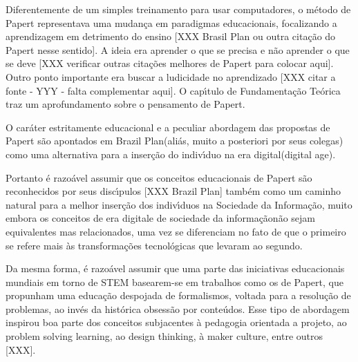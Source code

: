 \documentclass[
12pt,		%
openright,	%
twoside,  %
a4paper,			%
chapter=TITLE,		%
english,			%
french,				%
spanish,			%
brazil				%
]{USPSC-classe/USPSC_RedarTex}
\begin{document}
Diferentemente de um simples treinamento para usar computadores, o m\'etodo de Papert representava uma mudan\c{c}a em paradigmas educacionais, focalizando a aprendizagem em detrimento do ensino [XXX Brasil Plan ou outra cita\c{c}\~ao do Papert nesse sentido]. A ideia era \textquotedbl aprender o que se precisa e n\~ao \textquotedbl aprender o que se deve [XXX verificar outras cita\c{c}\~oes melhores de Papert para colocar aqui]. Outro ponto importante era buscar a ludicidade no aprendizado [XXX citar a fonte - YYY - falta complementar aqui]. O cap\'{\i}tulo de Fundamenta\c{c}\~ao Te\'orica traz um aprofundamento sobre o pensamento de Papert.










O car\'ater estritamente educacional e a peculiar abordagem das propostas de Papert s\~ao apontados em \textquotedbl Brazil Plan\textquotedbl  [XXX] (ali\'as, muito a posteriori por seus colegas) como uma alternativa para a inser\c{c}\~ao do indiv\'{\i}duo na \textquotedbl era digital\textquotedbl  (digital age).










Portanto \'e razo\'avel assumir que os conceitos educacionais de Papert s\~ao reconhecidos por seus disc\'{\i}pulos [XXX Brazil Plan] tamb\'em como um caminho natural para a melhor inser\c{c}\~ao dos indiv\'{\i}duos na Sociedade da Informa\c{c}\~ao, muito embora os conceitos de \textquotedbl era digital\textquotedbl  e de \textquotedbl sociedade da informa\c{c}\~ao\textquotedbl  n\~ao sejam equivalentes mas relacionados, uma vez se diferenciam no fato de que o primeiro se refere mais \`as transforma\c{c}\~oes tecnol\'ogicas que levaram ao segundo.










Da mesma forma, \'e razo\'avel assumir que uma parte das iniciativas educacionais mundiais em torno de STEM basearem-se em trabalhos como os de Papert, que propunham uma educa\c{c}\~ao despojada de formalismos, voltada para a resolu\c{c}\~ao de problemas, ao inv\'es da hist\'orica obsess\~ao por conte\'udos. Esse tipo de abordagem inspirou boa parte dos conceitos subjacentes \`a \textquotedbl pedagogia orientada a projeto\textquotedbl [XXX], ao \textquotedbl problem solving learning\textquotedbl [XXX], ao \textquotedbl design thinking, \`a \textquotedbl maker culture\textquotedbl , entre outros [XXX].
\end{document}
